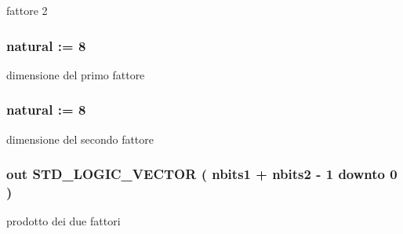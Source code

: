 fattore 2 

\subsubsection[{\texorpdfstring{nbits1}{nbits1}}]{ {\bfseries \textcolor{vhdlchar}{ }} {\bfseries \textcolor{vhdlchar}{natural}\textcolor{vhdlchar}{ }\textcolor{vhdlchar}{ }\textcolor{vhdlchar}{\+:}\textcolor{vhdlchar}{=}\textcolor{vhdlchar}{ }\textcolor{vhdlchar}{ } \textcolor{vhdldigit}{8} \textcolor{vhdlchar}{ }} \hspace{0.3cm}{\ttfamily [Generic]}}\hypertarget{group___multiplier_ga4ede473cdc13e75fe66fbd548b62e432}{}\label{group___multiplier_ga4ede473cdc13e75fe66fbd548b62e432}


dimensione del primo fattore 

\subsubsection[{\texorpdfstring{nbits2}{nbits2}}]{ {\bfseries \textcolor{vhdlchar}{ }} {\bfseries \textcolor{vhdlchar}{natural}\textcolor{vhdlchar}{ }\textcolor{vhdlchar}{ }\textcolor{vhdlchar}{\+:}\textcolor{vhdlchar}{=}\textcolor{vhdlchar}{ }\textcolor{vhdlchar}{ } \textcolor{vhdldigit}{8} \textcolor{vhdlchar}{ }} \hspace{0.3cm}{\ttfamily [Generic]}}\hypertarget{group___multiplier_ga8b5bdaff4c3669528aaec95a07e17c2a}{}\label{group___multiplier_ga8b5bdaff4c3669528aaec95a07e17c2a}


dimensione del secondo fattore 

\subsubsection[{\texorpdfstring{prod}{prod}}]{ {\bfseries \textcolor{vhdlchar}{out}\textcolor{vhdlchar}{ }} {\bfseries \textcolor{vhdlchar}{S\+T\+D\+\_\+\+L\+O\+G\+I\+C\+\_\+\+V\+E\+C\+T\+OR}\textcolor{vhdlchar}{ }\textcolor{vhdlchar}{(}\textcolor{vhdlchar}{ }\textcolor{vhdlchar}{ }\textcolor{vhdlchar}{ }\textcolor{vhdlchar}{ }{\bfseries {\bf nbits1}} \textcolor{vhdlchar}{+}\textcolor{vhdlchar}{ }\textcolor{vhdlchar}{ }\textcolor{vhdlchar}{ }{\bfseries {\bf nbits2}} \textcolor{vhdlchar}{-\/}\textcolor{vhdlchar}{ } \textcolor{vhdldigit}{1} \textcolor{vhdlchar}{ }\textcolor{vhdlchar}{downto}\textcolor{vhdlchar}{ }\textcolor{vhdlchar}{ } \textcolor{vhdldigit}{0} \textcolor{vhdlchar}{ }\textcolor{vhdlchar}{)}\textcolor{vhdlchar}{ }} \hspace{0.3cm}{\ttfamily [Port]}}\hypertarget{group___multiplier_gaf168dc69ad77dc5791b5e0f99dcfb0a9}{}\label{group___multiplier_gaf168dc69ad77dc5791b5e0f99dcfb0a9}


prodotto dei due fattori 

